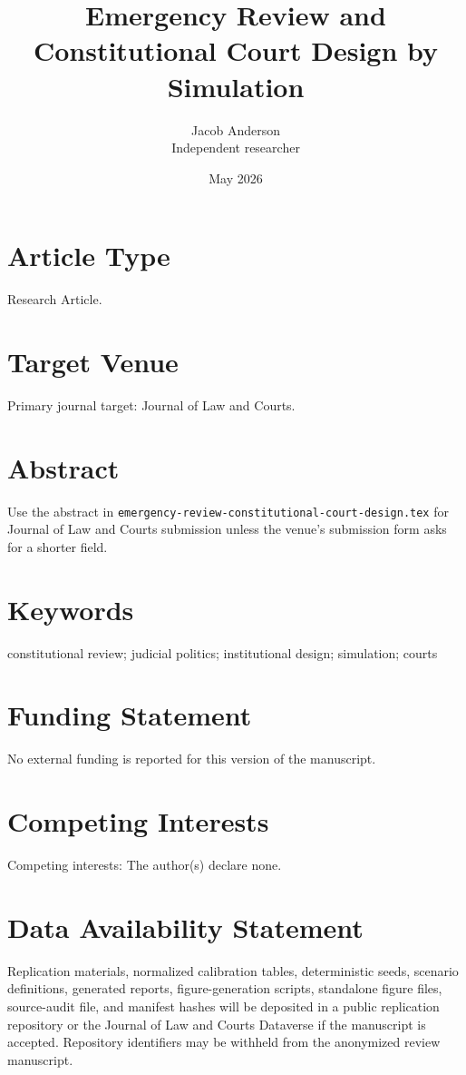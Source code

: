 \documentclass[11pt]{article}
\title{Emergency Review and Constitutional Court Design by Simulation}
\author{Jacob Anderson\\Independent researcher}
\date{May 2026}
\begin{document}
\maketitle

\section*{Article Type}

Research Article.

\section*{Target Venue}

Primary journal target: Journal of Law and Courts.

\section*{Abstract}

Use the abstract in \texttt{emergency-review-constitutional-court-design.tex} for Journal of Law and Courts submission unless the venue's submission form asks for a shorter field.

\section*{Keywords}

constitutional review; judicial politics; institutional design; simulation; courts

\section*{Funding Statement}

No external funding is reported for this version of the manuscript.

\section*{Competing Interests}

Competing interests: The author(s) declare none.

\section*{Data Availability Statement}

Replication materials, normalized calibration tables, deterministic seeds, scenario definitions, generated reports, figure-generation scripts, standalone figure files, source-audit file, and manifest hashes will be deposited in a public replication repository or the Journal of Law and Courts Dataverse if the manuscript is accepted. Repository identifiers may be withheld from the anonymized review manuscript.
\end{document}
